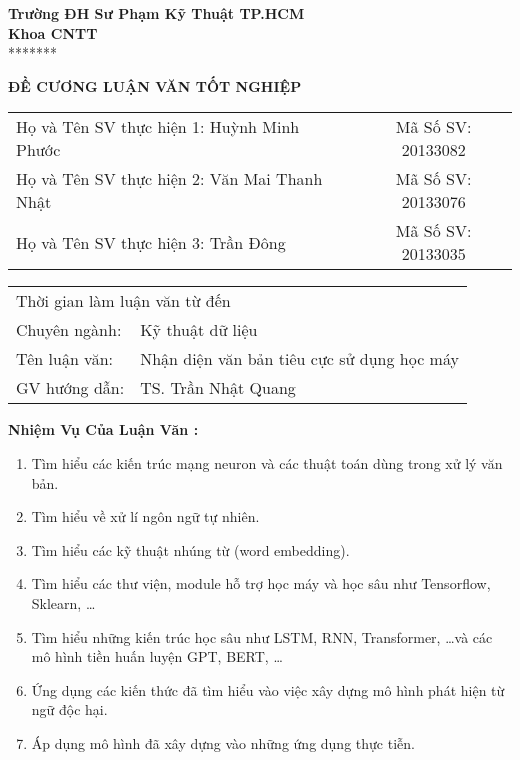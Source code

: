 
\noindent\begin{minipage}[t]{0.43\textwidth}
    \centering
    \fontsize{11pt}{16.5pt}
    \textbf{Trường ĐH Sư Phạm Kỹ Thuật TP.HCM}\\
    \textbf{Khoa CNTT}\\
    *******
\end{minipage}

\begin{center}
    \fontsize{18pt}{27pt}
    \textbf{ĐỀ CƯƠNG LUẬN VĂN TỐT NGHIỆP}
\end{center}

\begin{table}[!h]
    \centering
    \begin{tabularx}{0.8\textwidth}{ X c }
        Họ và Tên SV thực hiện 1: Huỳnh Minh Phước   & Mã Số SV: 20133082 \\
        Họ và Tên SV thực hiện 2: Văn Mai Thanh Nhật & Mã Số SV: 20133076 \\
        Họ và Tên SV thực hiện 3: Trần Đông          & Mã Số SV: 20133035 \\
    \end{tabularx}
\end{table}

\begin{center}
    \begin{tabular}{p{} p{}}
        \multicolumn{2}{l}{Thời gian làm luận văn từ\hspace{3cm} đến} \\
        Chuyên ngành: & Kỹ thuật dữ liệu                              \\
        Tên luận văn: & Nhận diện văn bản tiêu cực sử dụng học máy    \\
        GV hướng dẫn: & TS. Trần Nhật Quang
    \end{tabular}
\end{center}

\textbf{Nhiệm Vụ Của Luận Văn :}
\begin{enumerate}
    \item Tìm hiểu các kiến trúc mạng neuron và các thuật toán dùng trong xử lý văn bản.
    \item Tìm hiểu về xử lí ngôn ngữ tự nhiên.
    \item Tìm hiểu các kỹ thuật nhúng từ (word embedding).
    \item Tìm hiểu các thư viện, module hỗ trợ học máy và học sâu như Tensorflow, Sklearn, \dots
    \item Tìm hiểu những kiến trúc học sâu như LSTM, RNN, Transformer, \dots và các mô hình tiền huấn luyện GPT, BERT, \dots
    \item Ứng dụng các kiến thức đã tìm hiểu vào việc xây dựng mô hình phát hiện từ ngữ độc hại.
    \item Áp dụng mô hình đã xây dựng vào những ứng dụng thực tiễn.
\end{enumerate}


